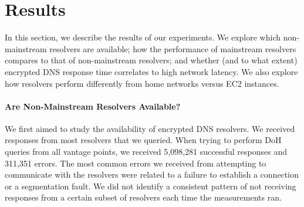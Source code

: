 \section{Results}\label{sec:results} 

In this section, we describe the results of our experiments.  We explore which
non-mainstream resolvers are available; how
the performance of mainstream resolvers compares to that of non-mainstream
resolvers; and whether (and to what extent) encrypted DNS response time
correlates to high network latency. We also explore how resolvers perform 
differently from home networks versus EC2 instances. 

\paragraph{Are Non-Mainstream Resolvers Available?}
We first aimed to study the availability of encrypted DNS
resolvers. 
We received responses from most resolvers that we queried. When trying to perform DoH queries from all vantage points,
we received 5,098,281 successful responses and 311,351 errors. 
The most common errors we received from attempting to communicate with
the resolvers were related to a failure to establish a connection or a segmentation fault.
We did not identify a consistent pattern of not receiving responses from a certain
subset of resolvers each time the measurements ran. 

